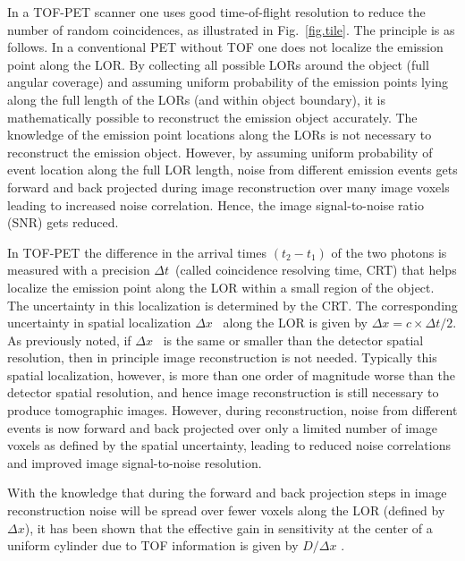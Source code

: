 \documentclass[review]{elsarticle}
\begin{document}
In a TOF-PET scanner one uses good time-of-flight resolution to reduce the number of random coincidences, as illustrated in Fig.~\ref{fig.tile}. The principle is as follows. In a conventional PET without TOF one does not localize the emission point along the LOR. By collecting all possible LORs around the object (full angular coverage) and assuming uniform probability of the emission points lying along the full length of the LORs (and within object boundary), it is mathematically possible to reconstruct the emission object accurately. The knowledge of the emission point locations along the LORs is not necessary to reconstruct the emission object. However, by assuming uniform probability of event location along the full LOR length, noise from different emission events gets forward and back projected during image reconstruction over many image voxels leading to increased noise correlation. Hence, the image signal-to-noise ratio (SNR) gets reduced.

In TOF-PET the difference in the arrival times $(t_2 - t_1)$ of the two photons is measured with a precision $\Delta t$~(called coincidence resolving time, CRT) that helps localize the emission point along the LOR within a small region of the object. The uncertainty in this localization is determined by the CRT. The corresponding uncertainty in spatial localization $\Delta x$~ along the LOR is given by 
$\Delta x=c \times \Delta t/2$. As previously noted, if $\Delta x$~ is the same or smaller than the detector spatial resolution, then in principle image reconstruction is not needed. Typically this spatial localization, however, is more than one order of magnitude worse than the detector spatial resolution, and hence image reconstruction is still necessary to produce tomographic images. However, during reconstruction, noise from different events is now forward and back projected over only a limited number of image voxels as defined by the spatial uncertainty, leading to reduced noise correlations and improved image signal-to-noise resolution.
%
%

With the knowledge that during the forward and back projection steps in image reconstruction noise will be spread over fewer voxels along the LOR (defined by $\Delta x$), it has been  shown  that the effective gain in sensitivity at the center of a uniform cylinder due to TOF information is given by $D/\Delta x$ \cite{snyder, budinger}. 
\end{document}
